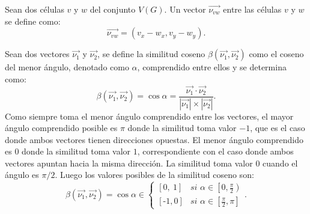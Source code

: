 \begin{definition}
\label{def-general-vector}
Sean dos c\'elulas $v$ y $w$ del conjunto $V(G)$. Un vector $\overrightarrow{\nu_{vw}}$ entre las c\'elulas $v$ y $w$ se define como:
\begin{equation}
\overrightarrow{\nu_{vw}} = \left(v_x - w_x, v_y - w_y \right). \label{eq-general-vector}
\end{equation}
\end{definition}

\begin{definition}
\label{def-sim}
Sean dos vectores $\overrightarrow{\nu_1}$ y $\overrightarrow{\nu_2}$, se define la similitud coseno $\beta(\overrightarrow{\nu_1},\overrightarrow{\nu_2})$ como el coseno del menor \'angulo, denotado como $\alpha$, comprendido entre ellos y se determina como:
\begin{equation}
\beta(\overrightarrow{\nu_1},\overrightarrow{\nu_2}) = \cos \alpha = \displaystyle\frac{\overrightarrow{\nu_1} \cdot \overrightarrow{\nu_2}}{|\overrightarrow{\nu_1}| \times |\overrightarrow{\nu_2}|}. \label{eq-sim}
\end{equation}
Como siempre toma el menor \'angulo comprendido entre los vectores, el mayor \'angulo comprendido posible es $\pi$ donde la similitud toma valor $-1$, que es el caso donde ambos vectores tienen direcciones opuestas. El menor \'angulo comprendido es $0$ donde la similitud toma valor $1$, correspondiente con el caso donde ambos vectores apuntan hacia la misma direcci\'on. La similitud toma valor $0$ cuando el \'angulo es $\pi /2$. Luego los valores posibles de la similitud coseno son:
\begin{equation}
\beta(\overrightarrow{\nu_1},\overrightarrow{\nu_2}) = \cos \alpha \in \left\lbrace
	\begin{array}{ll}
		\left[0,~1\right]& \textit{si } \alpha \in \left[0,\frac{\pi}{2} \right)\\
		\left[\textit{-}1,0\right]& \textit{si } \alpha \in \left[\frac{\pi}{2}, \pi \right]
	\end{array}
\right..
\end{equation}
\end{definition}


